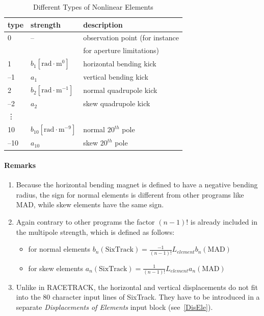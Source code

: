 \documentclass[a4paper,11pt]{report}
\begin{document}
\begin{table}[h]
\caption{Different Types of Nonlinear Elements}
\vspace{1em}
\label{T-NonEle}
\centering
\begin{tabular}{|l|l|l|}
  \hline
  type & strength & description \\
  \hline 0 & -- & observation point (for
  instance \\
  & &
  for aperture limitations) \\
  \hline 1 & $ b_{1} [\mathrm{rad} \cdot \mathrm{m}^{0}] $ &
  horizontal bending kick \\
  --1 & $ a_{1} $ &
  vertical bending kick \\
  \hline 2 & $ b_{2} [\mathrm{rad} \cdot \mathrm{m}^{-1}] $ &
  normal quadrupole kick \\
  --2 & $ a_{2} $ &
  skew quadrupole kick \\
  \hline
  \vdots & & \\
  \hline 10 & $ b_{10} [\mathrm{rad} \cdot \mathrm{m}^{-9}] $ &
  normal $20^{th}$ pole \\
  --10 & $ a_{10} $ & skew $20^{th}$ pole \\
  \hline
\end{tabular}
\end{table}

\paragraph{Remarks}
\begin{enumerate}
\item Because the horizontal bending magnet is defined to have a
  negative bending radius, the sign for normal elements is different
  from other programs like MAD, while skew elements have the same
  sign.
\item Again contrary to other programs the factor \mbox{$(n-1)$!}  is
  already included in the multipole strength, which is defined as
  follows:
 \begin{itemize}
 \item for normal elements \mbox{$ b_{n}(\mathrm{SixTrack}) =
     \frac{-1}{(n-1)!}  L_{element} b_{n}(\mathrm{MAD}) $}
 \item for skew elements \mbox{$ a_{n}(\mathrm{SixTrack}) =
     \frac{1}{(n-1)!}  L_{element} a_{n}(\mathrm{MAD}) $}
 \end{itemize}
\item Unlike in RACETRACK, the horizontal and vertical displacements
  do not fit into the 80 character input lines of SixTrack\@.  They
  have to be introduced in a separate {\em Displacements of Elements}
  \/input block (see~\ref{DisEle}).
\end{enumerate}
\end{document}

